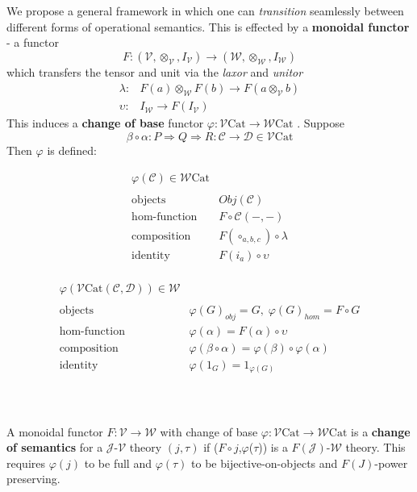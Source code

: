 \documentclass[a4paper,UKenglish]{article}
\theoremstyle{definition}
\newcommand{\Cat}{\mathrm{Cat}}
\newcommand{\V}{\mathscr{V}}
\newcommand{\W}{\mathscr{W}}
\newcommand{\C}{\mathscr{C}}
\newcommand{\D}{\mathscr{D}}
\newcommand{\J}{\mathscr{J}}
\begin{document}
We propose a general framework in which one can \textit{transition} seamlessly between different forms of operational semantics. This is effected by a \textbf{monoidal functor} - a functor $$F: (\V,\otimes_\V,I_\V) \to (\W,\otimes_\W,I_\W)$$ which transfers the tensor and unit via the \textit{laxor} and \textit{unitor}
\[\begin{array}{rl}
\lambda: & F(a) \otimes_\W F(b) \to F(a\otimes_\V b)\\
\upsilon: & I_\W \to F(I_\V)
\end{array}\]
This induces a \textbf{change of base} functor $\varphi:\V\Cat \to \W\Cat$ \cite{borceux}. Suppose $$\beta \circ \alpha: P \Rightarrow Q \Rightarrow R: \C \to \D \in \V\Cat$$ Then $\varphi$ is defined:\\
\begin{minipage}{.2 \textwidth}
	\[\begin{array}{rl}
	\varphi(\C) \in \W\Cat\\
	\\
	\text{objects} & Obj(\C)\\
	\text{hom-function} & F \circ \C(-,-)\\
	\text{composition} & F(\circ_{a,b,c}) \circ \lambda\\
	\text{identity} & F(i_a) \circ \upsilon\\
	\end{array}\]
\end{minipage}\qquad \qquad
\begin{minipage}{.2 \textwidth}
	\[\begin{array}{rl}
	\varphi(\V\Cat(\C,\D)) \in \W\\
	\\
	\text{objects} & \varphi(G)_{obj} = G, \; \varphi(G)_{hom} = F\circ G\\
	\text{hom-function} & \varphi(\alpha) = F(\alpha) \circ \upsilon\\
	\text{composition} & \varphi(\beta \circ \alpha) = \varphi(\beta) \circ \varphi(\alpha)\\
	\text{identity} & \varphi(1_G) = 1_{\varphi(G)}\\
	\end{array}\]
\end{minipage}\\~\\

A monoidal functor $F:\V \to \W$ with change of base $\varphi:\V\Cat \to \W\Cat$ is a \textbf{change of semantics} for a $\J$-$\V$ theory $(j,\tau)$ if ($F\circ j$,$\varphi$($\tau$)) is a $F(\J)$-$\W$ theory. This requires $\varphi(j)$ to be full and $\varphi(\tau)$ to be bijective-on-objects and $F(J)$-power preserving.
\end{document}
